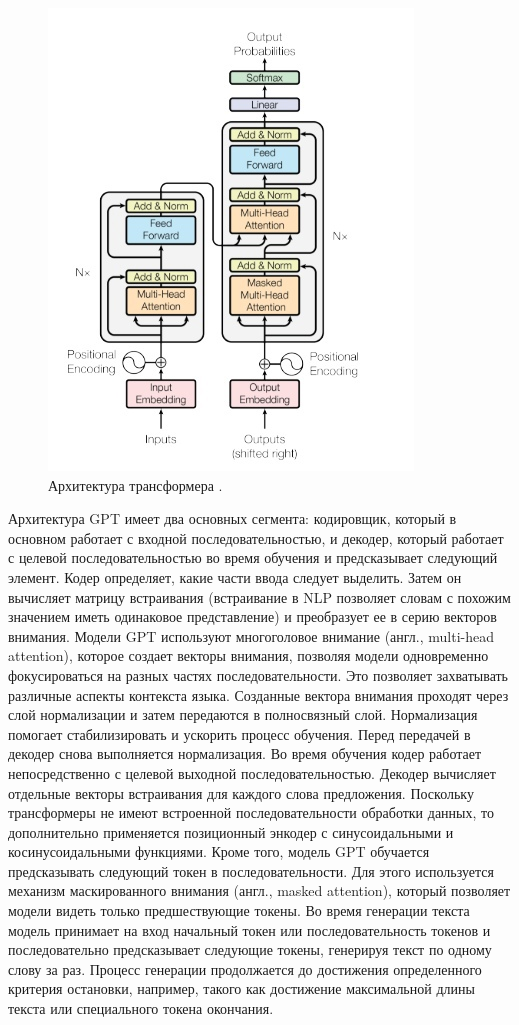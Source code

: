 \documentclass[a4paper,12pt]{extarticle}
\begin{document}
\begin{figure}[ht]
	\centering
	\includegraphics[scale=0.7]{transformer.png}
	\caption{Архитектура трансформера \cite{transformers}.}
	\label{fig:transformers_arch}
\end{figure}

Архитектура GPT имеет два основных сегмента: кодировщик, который в основном работает с входной последовательностью, и декодер, который работает с целевой последовательностью во время обучения и предсказывает следующий элемент.  Кодер определяет, какие части ввода следует выделить. Затем он вычисляет матрицу встраивания (встраивание в NLP позволяет словам с похожим значением иметь одинаковое представление) и преобразует ее в серию векторов внимания. Модели  GPT используют многоголовое внимание (англ., multi-head attention), которое создает векторы внимания, позволяя модели одновременно фокусироваться на разных частях последовательности. Это позволяет захватывать различные аспекты контекста языка. Созданные вектора внимания проходят через слой нормализации и затем передаются в полносвязный слой. Нормализация помогает стабилизировать и ускорить процесс обучения. Перед передачей в декодер снова выполняется нормализация. Во время обучения кодер работает непосредственно с целевой выходной последовательностью.  Декодер вычисляет отдельные векторы встраивания для каждого слова предложения. Поскольку трансформеры не имеют встроенной последовательности обработки данных, то дополнительно применяется позиционный энкодер с синусоидальными и косинусоидальными функциями. Кроме того, модель GPT обучается предсказывать следующий токен в последовательности. Для этого используется механизм маскированного внимания (англ., masked attention), который позволяет модели видеть только предшествующие токены. Во время генерации текста модель принимает на вход начальный токен или последовательность токенов и последовательно предсказывает следующие токены, генерируя текст по одному слову за раз. Процесс генерации продолжается до достижения определенного критерия остановки, например, такого как достижение максимальной длины текста или специального токена окончания.
\end{document}
